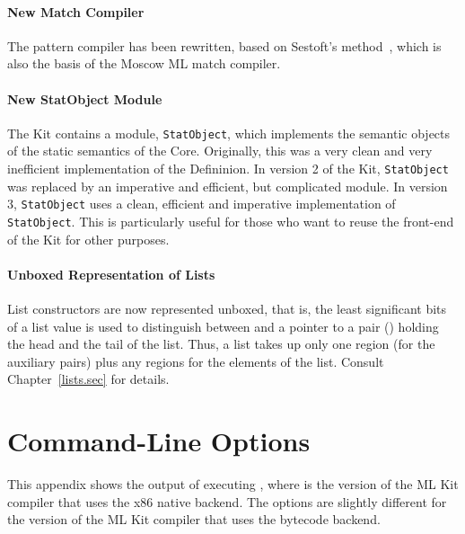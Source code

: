 \documentclass[12pt]{book}
\begin{document}
\subsubsection*{New Match Compiler}
The pattern compiler has been rewritten, based on Sestoft's 
method~\cite{sestoft96}, which is also the basis of the Moscow ML 
match compiler. 

\subsubsection*{New StatObject Module}
The Kit contains a module, 
%
{\tt StatObject}, which implements the semantic objects of the static
semantics of the Core.  Originally, this was a very clean and very
inefficient implementation of the Defininion. In version 2 of the Kit,
{\tt StatObject} was replaced by an imperative and efficient, but
complicated module.  In version 3, {\tt StatObject} uses a clean,
efficient and imperative implementation of {\tt StatObject}. This is
particularly useful for those who want to reuse the front-end of the
Kit for other purposes.

\subsubsection*{Unboxed Representation of Lists}
 List constructors are now represented unboxed, that is,
the least significant bits of a list value is used to distinguish
between  and a pointer to a pair (\boxml{::}) holding the
head and the tail of the list. Thus, a list takes up only one region
(for the auxiliary pairs) plus any regions for the elements of the
list. Consult Chapter~\ref{lists.sec} for details.

\nocite{total97,total94,btv96,elshal95,KochHojfeld96,H96,hallenberg99,brtt93}




\appendix

\chapter{Command-Line Options}
\label{mlkithelp.app}
This appendix shows the output of executing 
%
, where  is the version of the ML Kit
compiler that uses the 
%
x86 native backend. The options are slightly different for the version
of the ML Kit compiler that uses the bytecode backend.
\end{document}
